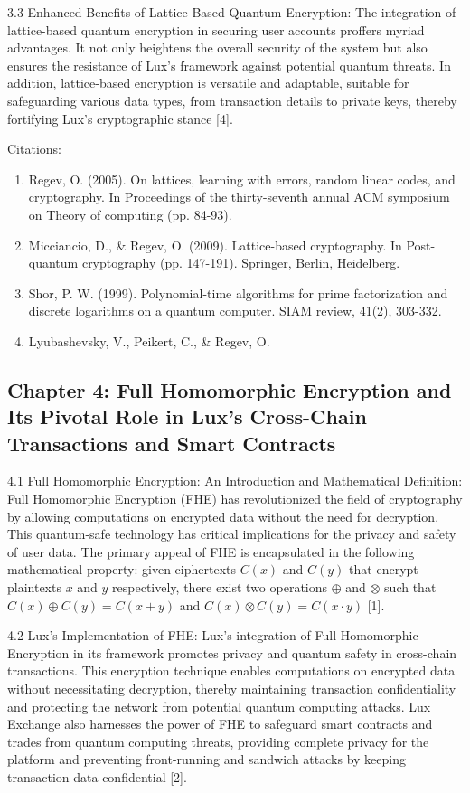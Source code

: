 \documentclass[11pt]{article}
\begin{document}
3.3 Enhanced Benefits of Lattice-Based Quantum Encryption: The integration of lattice-based quantum encryption in securing user accounts proffers myriad advantages. It not only heightens the overall security of the system but also ensures the resistance of Lux's framework against potential quantum threats. In addition, lattice-based encryption is versatile and adaptable, suitable for safeguarding various data types, from transaction details to private keys, thereby fortifying Lux's cryptographic stance [4].


Citations:

\begin{enumerate}
  \item Regev, O. (2005). On lattices, learning with errors, random linear codes, and cryptography. In Proceedings of the thirty-seventh annual ACM symposium on Theory of computing (pp. 84-93).
  \item Micciancio, D., \& Regev, O. (2009). Lattice-based cryptography. In Post-quantum cryptography (pp. 147-191). Springer, Berlin, Heidelberg.
  \item Shor, P. W. (1999). Polynomial-time algorithms for prime factorization and discrete logarithms on a quantum computer. SIAM review, 41(2), 303-332.
  \item Lyubashevsky, V., Peikert, C., \& Regev, O.
\end{enumerate}

\subsection{Chapter 4: Full Homomorphic Encryption and Its Pivotal Role in Lux's Cross-Chain Transactions and Smart Contracts}

4.1 Full Homomorphic Encryption: An Introduction and Mathematical Definition: Full Homomorphic Encryption (FHE) has revolutionized the field of cryptography by allowing computations on encrypted data without the need for decryption. This quantum-safe technology has critical implications for the privacy and safety of user data. The primary appeal of FHE is encapsulated in the following mathematical property: given ciphertexts \(C(x)\) and \(C(y)\) that encrypt plaintexts \(x\) and \(y\) respectively, there exist two operations \(\oplus\) and \(\otimes\) such that \(C(x) \oplus C(y) = C(x + y)\) and \(C(x) \otimes C(y) = C(x \cdot y)\) [1].


4.2 Lux's Implementation of FHE: Lux's integration of Full Homomorphic Encryption in its framework promotes privacy and quantum safety in cross-chain transactions. This encryption technique enables computations on encrypted data without necessitating decryption, thereby maintaining transaction confidentiality and protecting the network from potential quantum computing attacks. Lux Exchange also harnesses the power of FHE to safeguard smart contracts and trades from quantum computing threats, providing complete privacy for the platform and preventing front-running and sandwich attacks by keeping transaction data confidential [2].
\end{document}
